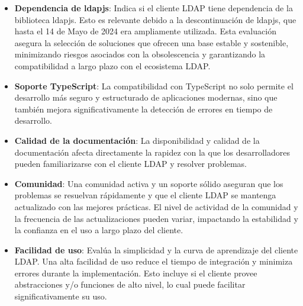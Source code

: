 \begin{itemize}
    \item \textbf{Dependencia de ldapjs}: Indica si el cliente LDAP tiene dependencia de la biblioteca ldapjs. Esto es relevante debido a la descontinuación de ldapjs, que hasta el 14 de Mayo de 2024 era ampliamente utilizada. Esta evaluación asegura la selección de soluciones que ofrecen una base estable y sostenible, minimizando riesgos asociados con la obsolescencia y garantizando la compatibilidad a largo plazo con el ecosistema LDAP.
    \item \textbf{Soporte TypeScript}: La compatibilidad con TypeScript no solo permite el desarrollo más seguro y estructurado de aplicaciones modernas, sino que también mejora significativamente la detección de errores en tiempo de desarrollo.
    \item \textbf{Calidad de la documentación}: La disponibilidad y calidad de la documentación afecta directamente la rapidez con la que los desarrolladores pueden familiarizarse con el cliente LDAP y resolver problemas.
    \item \textbf{Comunidad}: Una comunidad activa y un soporte sólido aseguran que los problemas se resuelvan rápidamente y que el cliente LDAP se mantenga actualizado con las mejores prácticas. El nivel de actividad de la comunidad y la frecuencia de las actualizaciones pueden variar, impactando la estabilidad y la confianza en el uso a largo plazo del cliente.
    \item \textbf{Facilidad de uso}: Evalúa la simplicidad y la curva de aprendizaje del cliente LDAP. Una alta facilidad de uso reduce el tiempo de integración y minimiza errores durante la implementación. Esto incluye si el cliente provee abstracciones y/o funciones de alto nivel, lo cual puede facilitar significativamente su uso.
\end{itemize}

